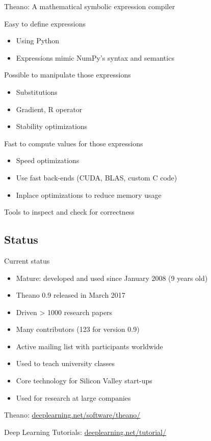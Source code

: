 \documentclass[a4paper,9pt]{beamer}
\begin{document}
\begin{frame}{Theano: A mathematical symbolic expression compiler}

  \begin{block}{Easy to define expressions}
    \begin{itemize}
      \item Using Python
      \item Expressions mimic NumPy's syntax and semantics
    \end{itemize}
  \end{block}

  \begin{block}{Possible to manipulate those expressions}
    \begin{itemize}
      \item Substitutions
      \item Gradient, R operator
      \item Stability optimizations
    \end{itemize}
  \end{block}

  \begin{block}{Fast to compute values for those expressions}
    \begin{itemize}
      \item Speed optimizations
      \item Use fast back-ends (CUDA, BLAS, custom C code)
      \item Inplace optimizations to reduce memory usage
    \end{itemize}
  \end{block}

  Tools to inspect and check for correctness
\end{frame}


\subsection{Status}

\begin{frame}[fragile]{Current status}
  \begin{itemize}
    \item Mature: developed and used since January 2008 (9 years old)
    \item Theano 0.9 released in March 2017
    \item Driven > 1000 research papers
    \item Many contributors (123 for version 0.9)
    \item Active mailing list with participants worldwide
    \item Used to teach university classes
    \item Core technology for Silicon Valley start-ups
    \item Used for research at large companies
  \end{itemize}
  Theano: \url{deeplearning.net/software/theano/}

  Deep Learning Tutorials: \url{deeplearning.net/tutorial/}
\end{frame}
\end{document}
